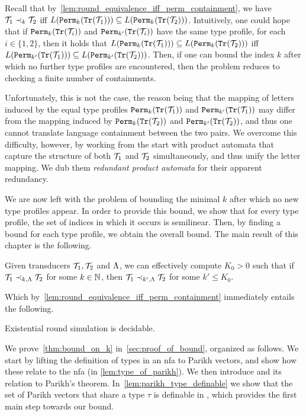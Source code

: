 Recall that by~\cref{lem:round_equivalence_iff_perm_containment}, we have $\mathcal{T}_1\prec_k \mathcal{T}_2$ iff $L({\mathtt{Perm}}_k({\mathtt{Tr}}(\mathcal{T}_1)))\subseteq L({\mathtt{Perm}}_{k}({\mathtt{Tr}}(\mathcal{T}_2)))$.
Intuitively, one could hope that if ${\mathtt{Perm}}_k({\mathtt{Tr}}(\mathcal{T}_i))$ and ${\mathtt{Perm}}_{k'}({\mathtt{Tr}}(\mathcal{T}_i))$ have the same type profile, for each $i\in \{1,2\}$, then it holds that $L({\mathtt{Perm}}_k({\mathtt{Tr}}(\mathcal{T}_1)))\subseteq L({\mathtt{Perm}}_{k}({\mathtt{Tr}}(\mathcal{T}_2)))$ iff $L({\mathtt{Perm}}_{k'}({\mathtt{Tr}}(\mathcal{T}_1)))\subseteq L({\mathtt{Perm}}_{k'}({\mathtt{Tr}}(\mathcal{T}_2)))$. Then, if one can bound the index $k$ after which no further type profiles are encountered, then the problem reduces to checking a finite number of containments.

Unfortunately, this is not the case, the reason being
that the mapping of letters induced by the equal type profiles ${\mathtt{Perm}}_k({\mathtt{Tr}}(\mathcal{T}_1))$ and ${\mathtt{Perm}}_{k'}({\mathtt{Tr}}(\mathcal{T}_1))$ may differ from the mapping induced by ${\mathtt{Perm}}_k({\mathtt{Tr}}(\mathcal{T}_2))$ and ${\mathtt{Perm}}_{k'}({\mathtt{Tr}}(\mathcal{T}_2))$, and thus one cannot translate language containment between the two pairs. We overcome this difficulty, however, by working from the start with product automata that capture the structure of both $\mathcal{T}_1$ and $\mathcal{T}_2$ simultaneously, and thus unify the letter mapping. We dub them \emph{redundant product automata} for their apparent redundancy.

We are now left with the problem of bounding the minimal $k$ after which 
no new type profiles appear.
In order to provide this bound, we show that for every type profile, the set of indices in which it occurs is semilinear. Then, by finding a bound for each type profile, we obtain the overall bound. 
The main result of this chapter is the following.
\begin{theorem}
\label{thm:bound_on_k}	
	Given transducers $\mathcal{T}_1,\mathcal{T}_2$ and $\Lambda$, we can effectively compute $K_0>0$ such that if $\mathcal{T}_1\prec_{k,\Lambda} \mathcal{T}_2$ for some $k\in \mathbb{N}$, then $\mathcal{T}_1\prec_{k',\Lambda} \mathcal{T}_2$ for some $k'\le K_0$.
\end{theorem}
Which by~\cref{lem:round_equivalence_iff_perm_containment} immediately entails the following.
\begin{corollary}
\label{cor:exist_k_decidable}
Existential round simulation is decidable.
\end{corollary}

We prove~\cref{thm:bound_on_k} in~\cref{sec:proof_of_bound}, organized as follows. We start by lifting the definition of types in an \gls{nfa} to Parikh vectors, and show how these relate to the \gls{nfa} (in \cref{lem:type_of_parikh}). We then introduce  and its relation to Parikh's theorem. In~\cref{lem:parikh_type_definable} we show that the set of Parikh vectors that share a type $\tau$ is definable in , which provides the first main step towards our bound.


